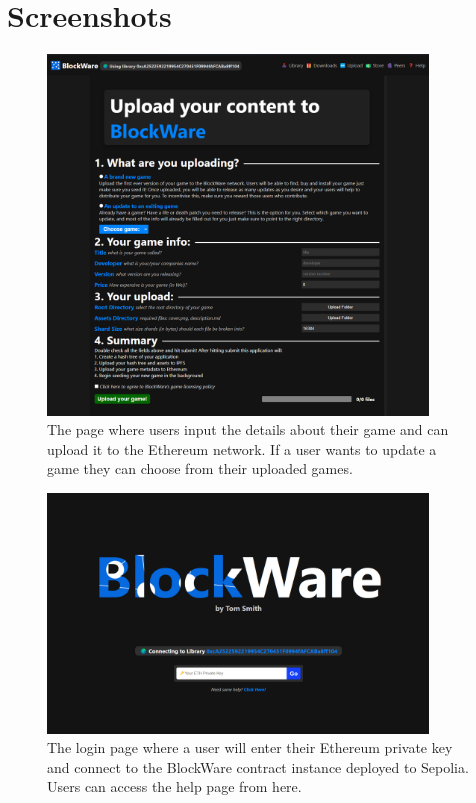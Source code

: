 \chapter{Screenshots}\label{app:screenshots}

\begin{figure}[H]
  \centering
  \includegraphics[width=0.9\textwidth]{assets/images/screenshots/upload.png}
  \caption{The page where users input the details about their game and can upload it to the Ethereum network. If a user wants to update a game they can choose from their uploaded games.}
\end{figure}

\begin{figure}[H]
  \centering
  \includegraphics[width=0.9\textwidth]{assets/images/screenshots/login.png}
  \caption{The login page where a user will enter their Ethereum private key and connect to the BlockWare contract instance deployed to Sepolia. Users can access the help page from here.}
\end{figure}

